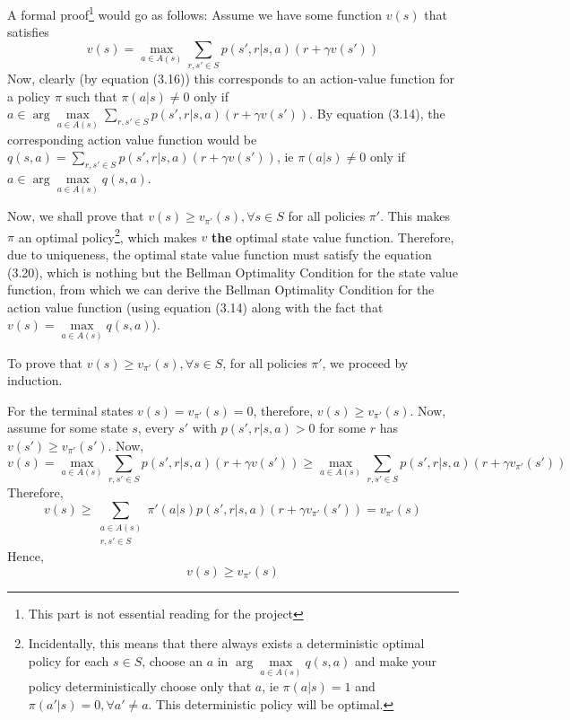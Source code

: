 \documentclass[12pt]{report}
\begin{document}
A formal proof\footnote{This part is not essential reading for the project} would go as follows:
Assume we have some function $v(s)$ that satisfies
\begin{equation}
    v(s) = \max_{a \in A(s)} \sum\limits_{r, s' \in S} p(s', r | s, a) (r + \gamma v(s'))
\end{equation}
Now, clearly (by equation (3.16)) this corresponds to an action-value function for a policy $\pi$ such that $\pi(a | s) \neq 0$ only if $a \in \arg\max\limits_{a \in A(s)} \sum\limits_{r, s' \in S} p(s', r | s, a) (r + \gamma v(s'))$. 
By equation (3.14), the corresponding action value function would be $q(s, a) = \sum\limits_{r, s' \in S} p(s', r | s, a) (r + \gamma v(s'))$, ie $\pi(a | s) \neq 0$ only if $a \in \arg\max\limits_{a \in A(s)} q(s, a)$.

Now, we shall prove that $v(s) \geq v_{\pi'}(s), \forall s \in S$ for all policies $\pi'$. This  makes $\pi$ an optimal policy\footnote{Incidentally, this means that there always exists a deterministic optimal policy for each $s \in S$, choose an $a$ in $\arg\max\limits_{a \in A(s)} q(s, a)$ and make your policy deterministically choose only that $a$, ie $\pi(a | s) = 1$ and $\pi(a' | s) = 0, \forall a' \neq a$. This deterministic policy will be optimal.}, which makes $v$ \textbf{the} optimal state value function.
Therefore, due to uniqueness, the optimal state value function must satisfy the equation (3.20), which is nothing but the Bellman Optimality Condition for the state value function, from which we can derive the Bellman Optimality Condition for the action value function (using equation (3.14) along with the fact that $v(s) = \max\limits_{a \in A(s)} q(s, a)$).

To prove that $v(s) \geq v_{\pi'}(s), \forall s \in S$, for all policies $\pi'$, we proceed by induction.

For the terminal states $v(s) = v_{\pi'}(s) = 0$, therefore, $v(s) \geq v_{\pi'}(s)$. Now, assume for some state $s$, every $s'$ with $p(s', r | s, a) > 0$ for some $r$ has $v(s') \geq v_{\pi'}(s')$.
Now,
\begin{equation}
    v(s) = \max_{a \in A(s)} \sum\limits_{r, s' \in S} p(s', r | s, a) (r + \gamma v(s')) \geq \max_{a \in A(s)} \sum\limits_{r, s' \in S} p(s', r | s, a) (r + \gamma v_{\pi'}(s'))
\end{equation}
Therefore,
\begin{equation}
    v(s) \geq \sum\limits_{\substack{a \in A(s)\\r, s' \in S}} \pi'(a | s) p(s', r | s, a) (r + \gamma v_{\pi'}(s')) = v_{\pi'}(s)
\end{equation}
Hence,
\begin{equation}
    v(s) \geq v_{\pi'}(s)
\end{equation}
\end{document}
